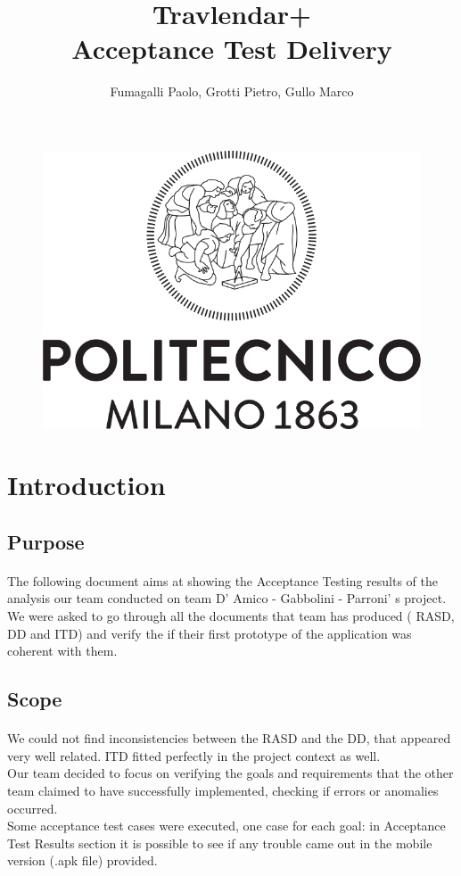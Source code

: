\documentclass{article}
\title{Travlendar+\\Acceptance Test Delivery}
\author{Fumagalli Paolo, Grotti Pietro, Gullo Marco}
\begin{document}
\begin{figure}[t]
\includegraphics[width=\linewidth]{Images/Logo_Politecnico_Milano.png}
\label{fig:Logo}
\end{figure}
\maketitle

\newpage
{}
\tableofcontents
\newpage
{}
	\section{Introduction}
		\subsection{Purpose}
			\paragraph{}The following document aims at showing the Acceptance Testing results of the analysis our team conducted on team D’ Amico - Gabbolini - Parroni’ s project. We were asked to go through all the documents that team has produced ( RASD, DD and ITD) and verify the if their first prototype of the application was coherent with them.    
		\subsection{Scope}
			\paragraph{}We could not find inconsistencies between the RASD and the DD, that appeared very well related. ITD fitted perfectly in the project context as well.\\Our team decided to focus on verifying the goals and requirements that the other team claimed to have successfully implemented, checking if errors or anomalies occurred.\\Some acceptance test cases were executed, one case for each goal: in Acceptance Test Results  section it is possible to see if any trouble came out in the mobile version (.apk file) provided. 
\end{document}
